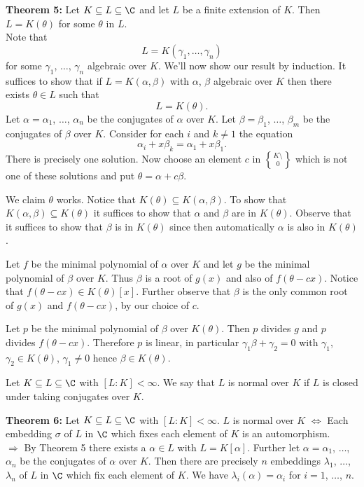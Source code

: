 \textbf{Theorem 5:} Let $K\subseteq L\subseteq\C$ and let $L$ be a finite extension of $K$.  Then $L=K(\theta)$ for some $\theta$ in $L$. \\
\pf Note that
\[ L = K(\gamma_1,\dotsc,\gamma_n) \]
for some $\gamma_1$, $\dotsc$, $\gamma_n$ algebraic over $K$.  We'll now show our result by induction.  It suffices to show that if $L=K(\alpha,\beta)$ with $\alpha$, $\beta$ algebraic over $K$ then there exists $\theta\in L$ such that
\[ L=K(\theta) . \]
Let $\alpha=\alpha_1$, $\dotsc$, $\alpha_n$ be the conjugates of $\alpha$ over $K$.
Let $\beta=\beta_1$, $\dotsc$, $\beta_m$ be the conjugates of $\beta$ over $K$.
Consider for each $i$ and $k\neq1$ the equation
\[ \alpha_i + x\beta_k = \alpha_1 + x \beta_1 . \]
There is precisely one solution.  Now choose an element $c$ in $K\setminus\brace{0}$ which is not one of these solutions and put $\theta=\alpha+c\beta$.

We claim $\theta$ works.  Notice that $K(\theta)\subseteq K(\alpha,\beta)$.  To show that $K(\alpha,\beta)\subseteq K(\theta)$ it suffices to show that $\alpha$ and $\beta$ are in $K(\theta)$.  Observe that it suffices to show that $\beta$ is in $K(\theta)$ since then automatically $\alpha$ is also in $K(\theta)$.

Let $f$ be the minimal polynomial of $\alpha$ over $K$ and let $g$ be the minimal polynomial of $\beta$ over $K$.  Thus $\beta$ is a root of $g(x)$ and also of $f(\theta-cx)$.  Notice that $f(\theta-cx)\in K(\theta)[x]$.  Further observe that $\beta$ is the only common root of $g(x)$ and $f(\theta-cx)$, by our choice of $c$.

Let $p$ be the minimal polynomial of $\beta$ over $K(\theta)$.  Then $p$ divides $g$ and $p$ divides $f(\theta-cx)$.  Therefore $p$ is linear, in particular $\gamma_1\beta+\gamma_2=0$ with $\gamma_1$, $\gamma_2\in K(\theta)$, $\gamma_1\neq0$ hence $\beta\in K(\theta)$.

 Let $K\subseteq L\subseteq\C$ with $[L:K]<\infty$.  We say that $L$ is normal over $K$ if $L$ is closed under taking conjugates over $K$.

\textbf{Theorem 6:} Let $K\subseteq L\subseteq\C$ with $[L:K]<\infty$.  $L$ is normal over $K$ $\iff$ Each embedding $\sigma$ of $L$ in $\C$ which fixes each element of $K$ is an automorphism. \\
\pf $\Rightarrow$ By Theorem 5 there exists a $\alpha\in L$ with $L=K[\alpha]$.  Further let $\alpha=\alpha_1$, $\dotsc$, $\alpha_n$ be the conjugates of $\alpha$ over $K$.  Then there are precisely $n$ embeddings $\lambda_1$, $\dotsc$, $\lambda_n$ of $L$ in $\C$ which fix each element of $K$.  We have $\lambda_i(\alpha)=\alpha_i$ for $i=1$, $\dotsc$, $n$.

